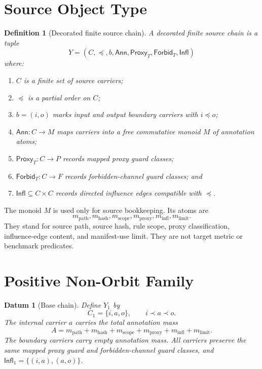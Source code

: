 \documentclass[11pt]{article}
\newcommand{\Ann}{\mathsf{Ann}}
\newcommand{\Proxy}{\mathsf{Proxy}_{T}}
\newcommand{\Forbid}{\mathsf{Forbid}_{T}}
\newcommand{\Infl}{\mathsf{Infl}}
\newtheorem{definitionblock}{Definition}
\newtheorem{datum}{Datum}
\begin{document}
\section{Source Object Type}

\begin{definitionblock}[Decorated finite source chain]
A decorated finite source chain is a tuple
\[
    Y=(C,\preceq,b,\Ann,\Proxy,\Forbid,\Infl)
\]
where:
\begin{enumerate}
    \item \(C\) is a finite set of source carriers;
    \item \(\preceq\) is a partial order on \(C\);
    \item \(b=(i,o)\) marks input and output boundary carriers with
    \(i\preceq o\);
    \item \(\Ann:C\to M\) maps carriers into a free commutative monoid
    \(M\) of annotation atoms;
    \item \(\Proxy:C\to P\) records mapped proxy guard classes;
    \item \(\Forbid:C\to F\) records forbidden-channel guard classes; and
    \item \(\Infl\subseteq C\times C\) records directed influence edges
    compatible with \(\preceq\).
\end{enumerate}
\end{definitionblock}

The monoid \(M\) is used only for source bookkeeping. Its atoms are
\[
    m_{\mathrm{path}},m_{\mathrm{hash}},m_{\mathrm{scope}},
    m_{\mathrm{proxy}},m_{\mathrm{infl}},m_{\mathrm{limit}}.
\]
They stand for source path, source hash, rule scope, proxy classification,
influence-edge content, and manifest-use limit. They are not target metric
or benchmark predicates.

\section{Positive Non-Orbit Family}

\begin{datum}[Base chain]
Define \(Y_{1}\) by
\[
    C_{1}=\{i,a,o\},\qquad i\prec a\prec o.
\]
The internal carrier \(a\) carries the total annotation mass
\[
    A=m_{\mathrm{path}}+m_{\mathrm{hash}}+m_{\mathrm{scope}}
    +m_{\mathrm{proxy}}+m_{\mathrm{infl}}+m_{\mathrm{limit}}.
\]
The boundary carriers carry empty annotation mass. All carriers preserve
the same mapped proxy guard and forbidden-channel guard classes, and
\(\Infl_{1}=\{(i,a),(a,o)\}\).
\end{datum}
\end{document}
